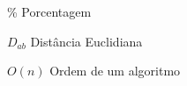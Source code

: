 \begin{simbolos}
    \item[\%] Porcentagem
    \item[$D_{ab}$] Distância Euclidiana
    \item[$O(n)$] Ordem de um algoritmo
\end{simbolos}
